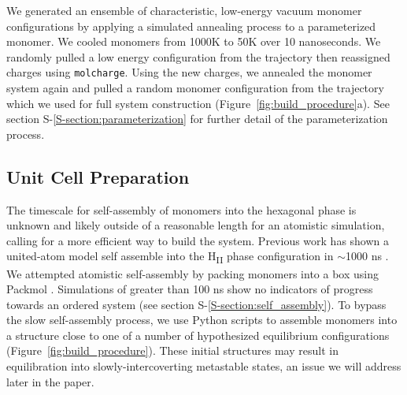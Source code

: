 \documentclass[journal=jpcbfk,manuscript=article]{achemso}
\begin{document}
  We generated an ensemble of characteristic, low-energy vacuum monomer
  configurations by applying a simulated annealing process to a
  parameterized monomer. We cooled monomers from 1000K to 50K over 10
  nanoseconds. We randomly pulled a low energy configuration from the
  trajectory then reassigned charges using \texttt{molcharge}. Using the new
  charges, we annealed the monomer system again and pulled a random monomer
  configuration from the trajectory which we used for full system
  construction (Figure~\ref{fig:build_procedure}a). See section S-\ref{S-section:parameterization} 
  for further detail of the parameterization process.

  \subsection{Unit Cell Preparation}

  The timescale for self-assembly of monomers into the hexagonal phase is
  unknown and likely outside of a reasonable length for an atomistic simulation,
  calling for a more efficient way to build the system. Previous work has shown
  a united-atom model self assemble into the H\textsubscript{II} phase
  configuration in $\sim$1000 ns \cite{mondal_self-assembly_2013}.  We
  attempted atomistic self-assembly by packing monomers into a box using Packmol
  \cite{martinez_packmol:_2009}. Simulations of greater than 100 ns show no
  indicators of progress towards an ordered system (see section S-\ref{S-section:self_assembly}). 
  To bypass the slow self-assembly process, we use Python scripts to assemble monomers
  into a structure close to one of a number of hypothesized equilibrium configurations
  (Figure~\ref{fig:build_procedure}).
  These initial structures may result in equilibration into slowly-intercoverting
  metastable states, an issue we will address later in the paper. 
  
\end{document}

